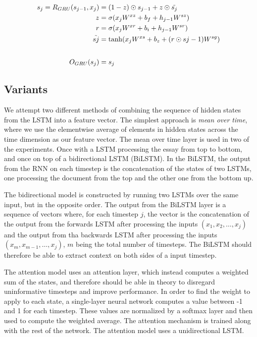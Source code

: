 \begin{equation}
  \begin{aligned}
  s_j = R_{GRU}(s_{j-1}, x_j) &= (1 - z) \odot s_{j-1} + z \odot \tilde{s_{j}} \\
                            z &= \sigma(x_j W^{xz} + b_f + h_{j-1} W^{sz}) \\
                            r &= \sigma(x_j W^{xr} + b_i + h_{j-1} W^{sr}) \\
                 \tilde{s{j}} &= \tanh(x_j W^{xs} + b_z + (r \odot s{j-1}) W^{sg}) \\
  \\[1\jot]
                 O_{GRU}(s_j) &= s_j
  \end{aligned}
\end{equation}


\subsection{Variants}

We attempt two different methods of combining the sequence of hidden states
from the \ac{LSTM} into a feature vector. The simplest approach is \emph{mean
over time}, where we use the elementwise average of elements in hidden states
across the time dimension as our feature vector. The mean over time layer is
used in two of the experiments. Once with a \ac{LSTM} processing the essay
from top to bottom, and once on top of a bidirectional LSTM (BiLSTM). In the
BiLSTM, the output from the \ac{RNN} on each timestep is the concatenation of
the states of two \acp{LSTM}, one processing the document from the top and
the other one from the bottom up.

 The bidirectional model is constructed by
running two \acp{LSTM} over the same input, but in the opposite order. The
output from the BiLSTM layer is a sequence of vectors where, for each
timestep $j$, the vector is the concatenation of the output from the forwards
\ac{LSTM} after processing the inputs $(x_1, x_2, \ldots, x_j)$ and the
output from tha backwards \ac{LSTM} after processing the inputs $(x_m,
x_{m-1}, \ldots, x_j)$, $m$ being the total number of timesteps. The BiLSTM
should therefore be able to extract context on both sides of a input
timestep.


The attention model uses an attention layer, which instead computes a
weighted sum of the states, and therefore should be able in theory to
disregard uninformative timesteps and improve performance. In order to find
the weight to apply to each state, a single-layer neural network computes a
value between -1 and 1 for each timestep. These values are normalized by a
softmax layer and then used to compute the weighted average. The attention
mechanism is trained along with the rest of the network. The attention model
uses a unidirectional \ac{LSTM}.

